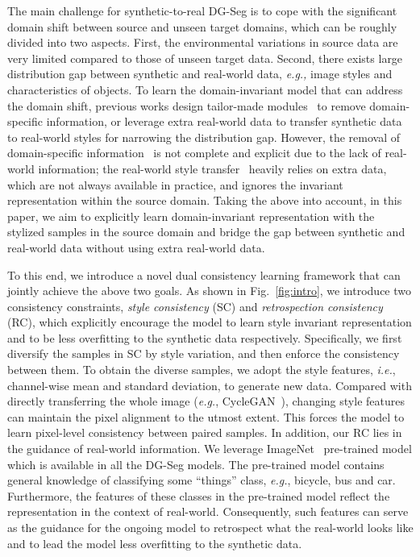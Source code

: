 \documentclass[runningheads]{llncs}
\def\eg{\emph{e.g.}} \def\Eg{\emph{E.g.}}
\def\ie{\emph{i.e.}} \def\Ie{\emph{I.e.}}
\begin{document}
The main challenge for synthetic-to-real DG-Seg is to cope with the significant domain shift between source and unseen target domains, which can be roughly divided into two aspects. First, the environmental variations in source data are very limited compared to those of unseen target data. 
Second, there exists large distribution gap between synthetic and real-world data, \textit{e.g.,} image styles and characteristics of objects.
To learn the domain-invariant model that can address the domain shift, 
previous works design tailor-made modules~\cite{robustnet,ibn} to remove domain-specific information, or leverage extra real-world data to transfer synthetic data~\cite{FSDR,DRPC} to real-world styles for narrowing the distribution gap.
However, the removal of domain-specific information~\cite{robustnet,ibn} is not complete and explicit due to the lack of real-world information; the real-world style transfer~\cite{FSDR,DRPC} heavily relies on extra data, which are not always available in practice, and ignores the invariant representation within the source domain.
Taking the above into account, in this paper, we aim to explicitly learn domain-invariant representation with the stylized samples in the source domain and bridge the gap between synthetic and real-world data without using extra real-world data.



To this end, we introduce a novel dual consistency learning framework that can jointly achieve the above two goals.
As shown in Fig.~\ref{fig:intro}, we introduce two consistency constraints, \textit{style consistency} (SC) and \textit{retrospection consistency} (RC), which explicitly encourage the model to learn style invariant representation and to be less overfitting to the synthetic data respectively. Specifically, we first diversify the samples in SC by style variation, and then enforce the consistency between them.
To obtain the diverse samples, we adopt the style features, \ie, channel-wise mean and standard deviation, to generate new data.
Compared with directly transferring the whole image (\eg, CycleGAN~\cite{cyclegan}), changing style features can maintain the pixel alignment to the utmost extent. This forces the model to learn pixel-level consistency between paired samples.
In addition, our RC lies in the guidance of real-world information. 
We leverage ImageNet~\cite{imagenet} pre-trained model which is available in all the DG-Seg models.
The pre-trained model contains general knowledge of classifying some ``things'' class, \eg, bicycle, bus and car. Furthermore, the features of these classes in the pre-trained model reflect
the representation in the context of real-world.
Consequently, such features can serve as the guidance for the ongoing model to retrospect 
what the real-world looks like
and to lead the model less overfitting to the synthetic data.
\end{document}
